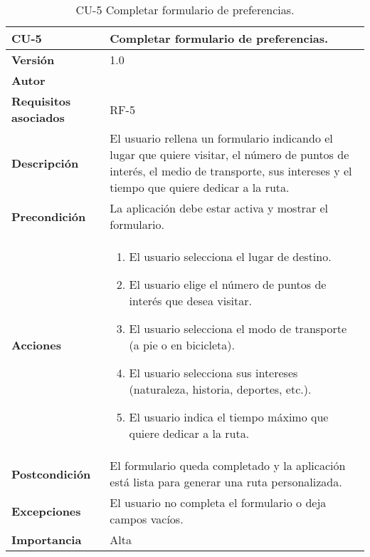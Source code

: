 \begin{table}[p]
	\centering
	\begin{tabularx}{\linewidth}{ p{} p{} }
		\toprule
		\textbf{CU-5}    & \textbf{Completar formulario de preferencias.}\\
		\toprule
		\textbf{Versión}              & 1.0    \\
		\textbf{Autor}                & \autor \\
		\textbf{Requisitos asociados} & RF-5 \\
		\textbf{Descripción}          & El usuario rellena un formulario indicando el lugar que quiere visitar, el número de puntos de interés, el medio de transporte, sus intereses y el tiempo que quiere dedicar a la ruta. \\
		\textbf{Precondición}         & La aplicación debe estar activa y mostrar el formulario. \\
		\textbf{Acciones}             &
		\begin{enumerate}
			\def\labelenumi{\arabic{enumi}.}
			\tightlist
			\item El usuario selecciona el lugar de destino.
			\item El usuario elige el número de puntos de interés que desea visitar.
			\item El usuario selecciona el modo de transporte (a pie o en bicicleta).
			\item El usuario selecciona sus intereses (naturaleza, historia, deportes, etc.).
			\item El usuario indica el tiempo máximo que quiere dedicar a la ruta.
		\end{enumerate}\\
		\textbf{Postcondición}        & El formulario queda completado y la aplicación está lista para generar una ruta personalizada. \\
		\textbf{Excepciones}          & El usuario no completa el formulario o deja campos vacíos. \\
		\textbf{Importancia}          & Alta  \\
		\bottomrule
	\end{tabularx}
	\caption{CU-5 Completar formulario de preferencias.}
\end{table}

